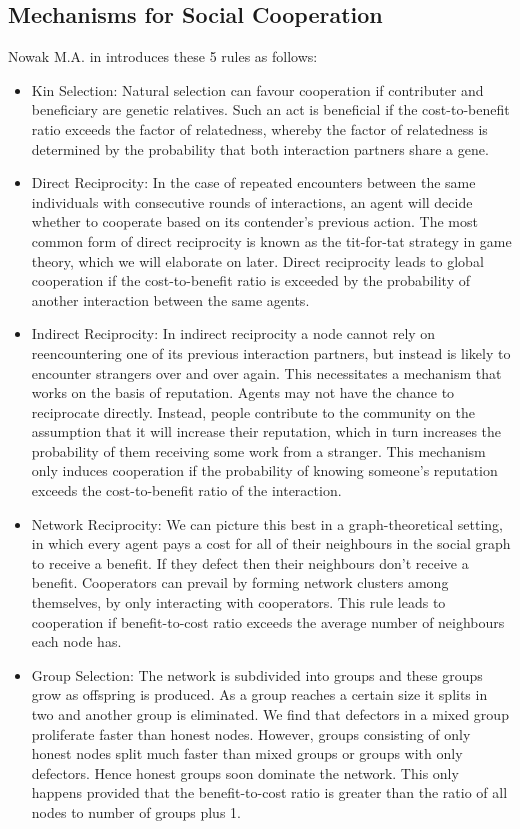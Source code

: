 \documentclass[11pt,a4paper]{report}
\theoremstyle{definition}
\theoremstyle{theorem}
\theoremstyle{proposition}
\theoremstyle{corollary}
\theoremstyle{lemma}
\theoremstyle{example}
\theoremstyle{remark}
\begin{document}
\subsection{Mechanisms for Social Cooperation}
\label{subsec:Mechanisms for Social Cooperation}
Nowak M.A. in \cite{5 Rules for the Evolution of Cooperation} introduces these 5 rules as follows:
\begin{itemize}
\item Kin Selection: Natural selection can favour cooperation if contributer and beneficiary are genetic relatives. Such an act is beneficial if the cost-to-benefit ratio exceeds the factor of relatedness, whereby the factor of relatedness is determined by the probability that both interaction partners share a gene.
\item Direct Reciprocity: In the case of repeated encounters between the same individuals with consecutive rounds of interactions, an agent will decide whether to cooperate based on its contender's previous action. The most common form of direct reciprocity is known as the tit-for-tat strategy in game theory, which we will elaborate on later. Direct reciprocity leads to global cooperation if the cost-to-benefit ratio is exceeded by the probability of another interaction between the same agents.
\item Indirect Reciprocity: In indirect reciprocity a node cannot rely on reencountering one of its previous interaction partners, but instead is likely to encounter strangers over and over again. %
This necessitates a mechanism that works on the basis of reputation. Agents may not have the chance to reciprocate directly. Instead, people contribute to the community on the assumption that it will increase their reputation, which in turn increases the probability of them receiving some work from a stranger. This mechanism only induces cooperation if the probability of knowing someone's reputation exceeds the cost-to-benefit ratio of the interaction.
\item Network Reciprocity: We can picture this best in a graph-theoretical setting, in which every agent pays a cost for all of their neighbours in the social graph to receive a benefit. If they defect then their neighbours don't receive a benefit. Cooperators can prevail by forming network clusters among themselves, by only interacting with cooperators. This rule leads to cooperation if benefit-to-cost ratio exceeds the average number of neighbours each node has. 
\item Group Selection: The network is subdivided into groups and these groups grow as offspring is produced. As a group reaches a certain size  it splits in two and another group is eliminated. We find that defectors in a mixed group proliferate faster than honest nodes. However, groups consisting of only honest nodes split much faster than mixed groups or groups with only defectors. Hence honest groups soon dominate the network. This only happens provided that the benefit-to-cost ratio is greater than the ratio of all nodes to number of groups plus 1. \vspace{1em}\\
\end{itemize}
\end{document}
